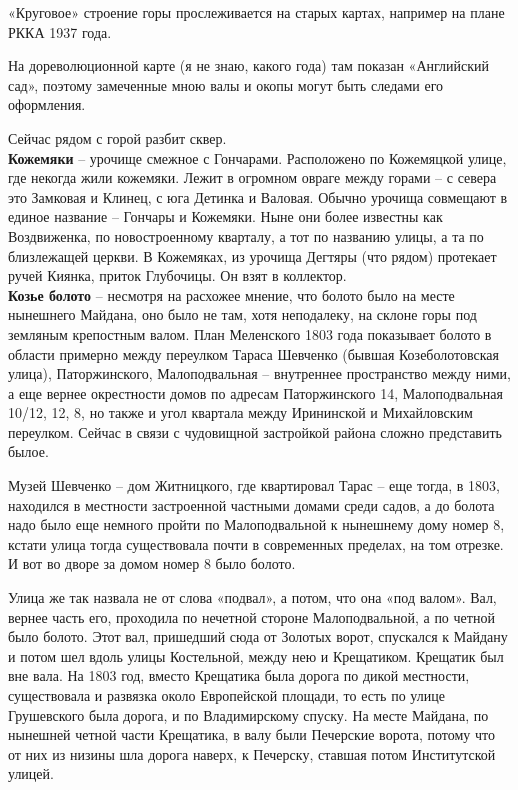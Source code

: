 «Круговое» строение горы прослеживается на старых картах, например на плане РККА 1937 года.

На дореволюционной карте (я не знаю, какого года) там показан «Английский сад», поэтому замеченные мною валы и окопы могут быть следами его оформления.

Сейчас рядом с горой разбит сквер.\\


\textbf{Кожемяки} – урочище смежное с Гончарами. Расположено по Кожемяцкой улице, где некогда жили кожемяки. Лежит в огромном овраге между горами – с севера это Замковая и Клинец, с юга Детинка и Валовая. Обычно урочища совмещают в единое название – Гончары и Кожемяки. Ныне они более известны как Воздвиженка, по новостроенному кварталу, а тот по названию улицы, а та по близлежащей церкви. В Кожемяках, из урочища Дегтяры (что рядом) протекает ручей Киянка, приток Глубочицы. Он взят в коллектор.\\


\textbf{Козье болото} – несмотря на расхожее мнение, что болото было на месте нынешнего Майдана, оно было не там, хотя неподалеку, на склоне горы под земляным крепостным валом. План Меленского 1803 года показывает болото в области примерно между переулком Тараса Шевченко (бывшая Козеболотовская улица), Паторжинского, Малоподвальная – внутреннее пространство между ними, а еще вернее окрестности домов по адресам Паторжинского 14, Малоподвальная 10/12, 12, 8, но также и угол квартала между Ирининской и Михайловским переулком. Сейчас в связи с чудовищной застройкой района сложно представить былое.

Музей Шевченко – дом Житницкого, где квартировал Тарас – еще тогда, в 1803, находился в местности застроенной частными домами среди садов, а до болота надо было еще немного пройти по Малоподвальной к нынешнему дому номер 8, кстати улица тогда существовала почти в современных пределах, на том отрезке. И вот во дворе за домом номер 8 было болото.

Улица же так назвала не от слова «подвал», а потом, что она «под валом». Вал, вернее часть его, проходила по нечетной стороне Малоподвальной, а по четной было болото. Этот вал, пришедший сюда от Золотых ворот, спускался к Майдану и потом шел вдоль улицы Костельной, между нею и Крещатиком. Крещатик был вне вала. На 1803 год, вместо Крещатика была дорога по дикой местности, существовала и развязка около Европейской площади, то есть по улице Грушевского была дорога, и по Владимирскому спуску. На месте Майдана, по нынешней четной части Крещатика, в валу были Печерские ворота, потому что от них из низины шла дорога наверх, к Печерску, ставшая потом Институтской улицей.

